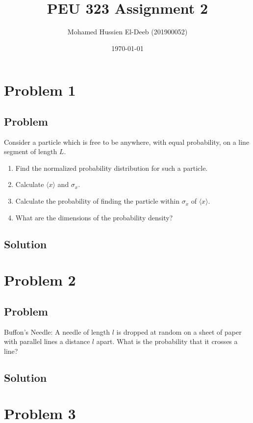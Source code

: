 \documentclass[12pt]{article}
\title{PEU 323 Assignment 2}
\author{Mohamed Hussien El-Deeb (201900052)}
\date{\today}
\begin{document}
\maketitle
\tableofcontents

\section{Problem 1}

\subsection{Problem}

Consider a particle which is free to be anywhere, with equal probability, on a line segment of length \(L\).

\renewcommand{\labelenumi}{(\alph{enumi})}
\begin{enumerate}
    \item Find the normalized probability distribution for such a particle.
    \item Calculate \(\langle x\rangle\) and \(\sigma_{x}\).
    \item Calculate the probability of finding the particle within \(\sigma_{x}\) of \(\langle x\rangle\).
    \item What are the dimensions of the probability density?
\end{enumerate}

\subsection{Solution}

\section{Problem 2}

\subsection{Problem}

Buffon's Needle: A needle of length \(l\) is dropped at random on a sheet of paper with parallel lines a distance \(l\) apart. What is the probability that it crosses a line?

\subsection{Solution}

\section{Problem 3}
\end{document}
